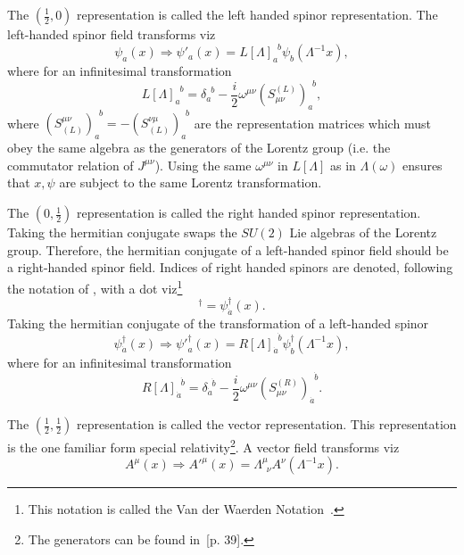 \begin{example}
	The $(\frac{1}{2},0)$ representation is called the left handed spinor representation. The left-handed spinor field transforms viz
	\begin{equation}
		\psi_a(x)\Rightarrow \psi'_a(x)=L[\Lambda]_a^{\,\,\, b}\psi_b(\Lambda^{-1}x),
	\end{equation} 
	where for an infinitesimal transformation
	\begin{equation}
		L[\Lambda]_a^{\,\,\, b}=\delta_a^{\,\,\, b}-\frac{i}{2}\omega^{\mu\nu}(S^{(L)}_{\mu\nu})_a^{\,\,\, b},
	\end{equation} 
	where $(S_{(L)}^{\mu\nu})_a^{\,\,\, b}=-(S_{(L)}^{\nu\mu})_a^{\,\,\, b}$ are the representation matrices which must obey the same algebra as the generators of the Lorentz group (i.e. the commutator relation of $J^{\mu\nu}$). Using the same $\omega^{\mu\nu}$ in $L[\Lambda]$ as in $\Lambda(\omega)$ ensures that $x,\psi$ are subject to the same Lorentz transformation.	
\end{example}
\begin{example}
	The $(0,\frac{1}{2})$ representation is called the right handed spinor representation. Taking the hermitian conjugate swaps the $SU(2)$ Lie algebras of the Lorentz group. Therefore, the hermitian conjugate of a left-handed spinor field should be a right-handed spinor field. Indices of right handed spinors are denoted, following the notation of \citet{Srednicki2027}, with a dot viz\footnote{This notation is called the Van der Waerden Notation~\citep{Schwichtenberg2015}.}
	\begin{equation}
		[\psi_a(x)]^\dagger=\psi_{\dot{a}}^\dagger(x).
	\end{equation} 
	Taking the hermitian conjugate of the transformation of a left-handed spinor
	\begin{equation}
		\psi^\dagger_{\dot{a}}(x)\Rightarrow {\psi'}^\dagger_a(x)=R[\Lambda]_{\dot{a}}^{\,\,\, \dot{b}}\psi^\dagger_{\dot{b}}(\Lambda^{-1}x),
	\end{equation} 
	where for an infinitesimal transformation
	\begin{equation}
		R[\Lambda]_{\dot{a}}^{\,\,\, \dot{b}}=\delta_{\dot{a}}^{\,\,\, \dot{b}}-\frac{i}{2}\omega^{\mu\nu}(S^{(R)}_{\mu\nu})_{\dot{a}}^{\,\,\, \dot{b}}.
	\end{equation} 
\end{example}
\begin{example}
	The $(\frac{1}{2},\frac{1}{2})$ representation is called the vector representation. This representation is the one familiar form special relativity\footnote{The generators can be found in~\citet{Peskin1995}[p. 39].}. A vector field transforms viz
	\begin{equation}
		A^{\mu}(x)\Rightarrow {A'}^{\mu}(x)=\Lambda^\mu_{\,\,\,\nu}A^\nu(\Lambda^{-1}x).
	\end{equation} 
\end{example}

